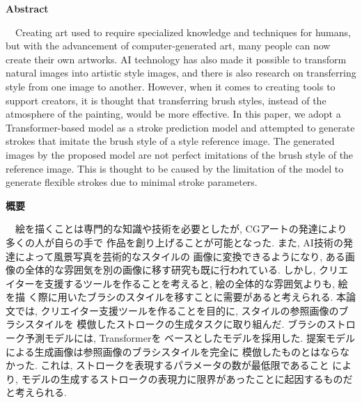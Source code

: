 \documentclass[a4paper, oneside, 12pt, dvipdfmx]{book}
\begin{document}
\pagebreak
\hspace{0pt}
\vfill %
    \begin{center}
        \textbf{Abstract}
    \end{center}
    　Creating art used to require specialized knowledge and techniques for humans,
    but with the advancement of computer-generated art, many people can now create
    their own artworks. AI technology has also made it possible to transform 
    natural images into artistic style images, and there is also research on 
    transferring style from one image to another. However, when it comes to 
    creating tools to support creators, it is thought that transferring brush 
    styles, instead of the atmosphere of the painting, would be more effective. 
    In this paper, we adopt a Transformer-based model as a stroke prediction model 
    and attempted to generate strokes that imitate the brush style of a style 
    reference image. The generated images by the proposed model are not perfect 
    imitations of the brush style of the reference image. This is thought to be 
    caused by the limitation of the model to generate flexible strokes due to 
    minimal stroke parameters.

\vfill
\pagebreak

\pagebreak
\hspace{0pt}
\vfill %
    \begin{center}
        \textbf{概要}
    \end{center}
    　絵を描くことは専門的な知識や技術を必要としたが, CGアートの発達により多くの人が自らの手で
    作品を創り上げることが可能となった. また, AI技術の発達によって風景写真を芸術的なスタイルの
    画像に変換できるようになり, ある画像の全体的な雰囲気を別の画像に移す研究も既に行われている.
    しかし, クリエイターを支援するツールを作ることを考えると, 絵の全体的な雰囲気よりも, 絵を描
    く際に用いたブラシのスタイルを移すことに需要があると考えられる.
    本論文では, クリエイター支援ツールを作ることを目的に, スタイルの参照画像のブラシスタイルを
    模倣したストロークの生成タスクに取り組んだ. ブラシのストローク予測モデルには, Transformerを
    ベースとしたモデルを採用した.  提案モデルによる生成画像は参照画像のブラシスタイルを完全に
    模倣したものとはならなかった. これは, ストロークを表現するパラメータの数が最低限であること
    により, モデルの生成するストロークの表現力に限界があったことに起因するものだと考えられる.
\vfill
\pagebreak
\end{document}
